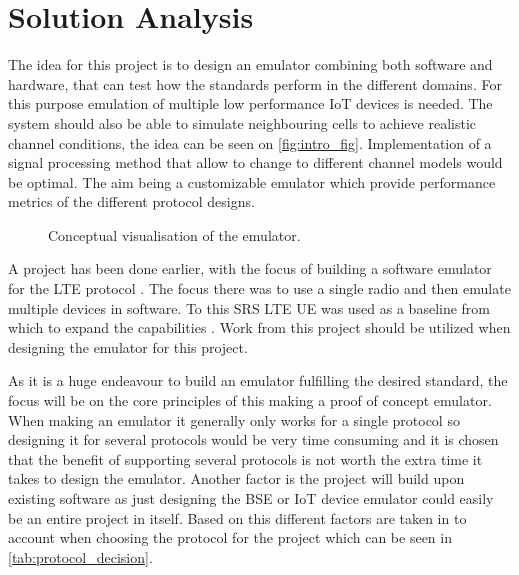 \section{Solution Analysis}



The idea for this project is to design an emulator combining both software and hardware, that can test how the standards perform in the different domains. For this purpose emulation of multiple low performance \gls{IoT} devices is needed. The system should also be able to simulate neighbouring cells to achieve realistic channel conditions, the idea can be seen on \autoref{fig:intro_fig}. Implementation of a signal processing method that allow to change to different channel models would be optimal. The aim being a customizable emulator which provide performance metrics of the different protocol designs. 

\begin{figure}
\resizebox{0.4\textwidth}{!}{
}
\caption{Conceptual visualisation of the emulator.}
\label{fig:intro_fig}
\end{figure}

A project has been done earlier, with the focus of building a software emulator for the LTE protocol \citep{thesis_report}. The focus there was to use a single radio and then emulate multiple devices in software. To this SRS LTE UE was used as a baseline from which to expand the capabilities \citep{thesis_report}. Work from this project should be utilized when designing the emulator for this project.

As it is a huge endeavour to build an emulator fulfilling the desired standard, the focus will be on the core principles of this making a proof of concept emulator. When making an emulator it generally only works for a single protocol so designing it for several protocols would be very time consuming and it is chosen that the benefit of supporting several protocols is not worth the extra time it takes to design the emulator. Another factor is the project will build upon existing software as just designing the \gls{BSE} or \gls{IoT} device emulator could easily be an entire project in itself. Based on this different factors are taken in to account when choosing the protocol for the project which can be seen in \autoref{tab:protocol_decision}.

